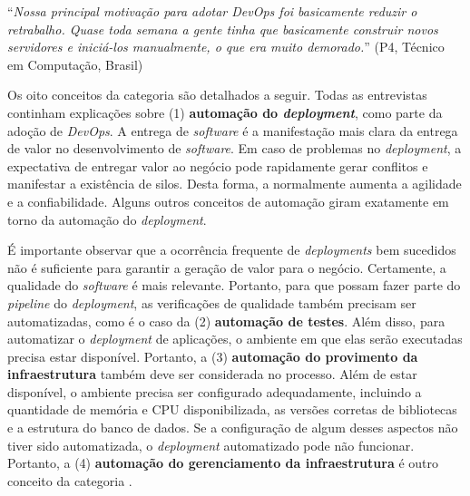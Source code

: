 \begin{mq}
``\emph{Nossa principal motivação para adotar DevOps foi basicamente reduzir o
retrabalho. Quase toda semana a gente tinha que basicamente construir novos
servidores e iniciá-los manualmente, o que era muito demorado.}'' (P4, Técnico
em Computação, Brasil)
\end{mq}

Os oito conceitos da categoria  são detalhados a seguir.
Todas as entrevistas continham explicações sobre (1) {\bf automação do \emph{deployment}},
como parte da adoção de {\it DevOps}. A entrega de {\it software} é a
manifestação mais clara da entrega de valor no desenvolvimento de {\it software}.
Em caso de problemas no {\it deployment}, a expectativa de entregar valor ao
negócio pode rapidamente gerar conflitos e manifestar a existência de silos.
Desta forma, a  normalmente aumenta a agilidade e a confiabilidade.
Alguns outros conceitos de automação giram exatamente em torno da automação do
{\it deployment}.

É importante observar que a ocorrência frequente de {\it deployments} bem
sucedidos não é suficiente para garantir a geração de valor para o negócio.
Certamente, a qualidade do {\it software} é mais relevante. Portanto, para que possam
fazer parte do {\it pipeline} do {\it deployment}, as verificações de qualidade
também precisam ser automatizadas, como é o caso da (2) {\bf automação de testes}.
Além disso, para automatizar o {\it deployment} de aplicações, o ambiente em
que elas serão executadas precisa estar disponível. Portanto, a (3) {\bf automação
do provimento da infraestrutura} também deve ser considerada no processo. Além
de estar disponível, o ambiente precisa ser configurado adequadamente,
incluindo a quantidade de memória e CPU disponibilizada, as versões corretas de
bibliotecas  e a estrutura do banco de dados. Se a configuração de algum
desses aspectos não tiver sido automatizada, o {\it deployment} automatizado
pode não funcionar. Portanto, a (4) {\bf automação do gerenciamento da
infraestrutura} é outro conceito da categoria .


